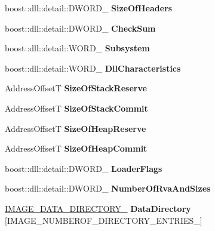 \begin{DoxyCompactItemize}
\item 
\mbox{\label{a01608_a77dcf3b10986bd7e1b033d872244cfec}} 
boost\+::dll\+::detail\+::\+D\+W\+O\+R\+D\+\_\+ {\bfseries Size\+Of\+Headers}
\item 
\mbox{\label{a01608_a290ac7f032b9881ffffd7bfa46217466}} 
boost\+::dll\+::detail\+::\+D\+W\+O\+R\+D\+\_\+ {\bfseries Check\+Sum}
\item 
\mbox{\label{a01608_a64a35e14d2ee9b281a3ea11608651764}} 
boost\+::dll\+::detail\+::\+W\+O\+R\+D\+\_\+ {\bfseries Subsystem}
\item 
\mbox{\label{a01608_ae44cfe64d4300c53e8d5e34851c935fd}} 
boost\+::dll\+::detail\+::\+W\+O\+R\+D\+\_\+ {\bfseries Dll\+Characteristics}
\item 
\mbox{\label{a01608_a2eae163c87c83ceda7a1b3421440170c}} 
Address\+OffsetT {\bfseries Size\+Of\+Stack\+Reserve}
\item 
\mbox{\label{a01608_a61ac48e1d510e8e16e5de73712cd507a}} 
Address\+OffsetT {\bfseries Size\+Of\+Stack\+Commit}
\item 
\mbox{\label{a01608_ace811d417f6d2a48b5f4b036d42474d9}} 
Address\+OffsetT {\bfseries Size\+Of\+Heap\+Reserve}
\item 
\mbox{\label{a01608_afb37e14279a636d93b4c748ad5e4c1b1}} 
Address\+OffsetT {\bfseries Size\+Of\+Heap\+Commit}
\item 
\mbox{\label{a01608_a377c1c91e9fe0b9a19297b9689f9dd40}} 
boost\+::dll\+::detail\+::\+D\+W\+O\+R\+D\+\_\+ {\bfseries Loader\+Flags}
\item 
\mbox{\label{a01608_ad53ec3441a0a0bfe7d5518b2a4a9e0cb}} 
boost\+::dll\+::detail\+::\+D\+W\+O\+R\+D\+\_\+ {\bfseries Number\+Of\+Rva\+And\+Sizes}
\item 
\mbox{\label{a01608_a7d7188872466b668272c7daaf937b9dc}} 
\hyperlink{a01592}{I\+M\+A\+G\+E\+\_\+\+D\+A\+T\+A\+\_\+\+D\+I\+R\+E\+C\+T\+O\+R\+Y\+\_\+} {\bfseries Data\+Directory} \mbox{[}I\+M\+A\+G\+E\+\_\+\+N\+U\+M\+B\+E\+R\+O\+F\+\_\+\+D\+I\+R\+E\+C\+T\+O\+R\+Y\+\_\+\+E\+N\+T\+R\+I\+E\+S\+\_\+\mbox{]}
\end{DoxyCompactItemize}
